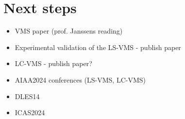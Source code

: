 \documentclass{beamer}
\begin{document}
\section{Next steps}
\begin{frame}
\begin{itemize}
	\item VMS paper (prof. Janssens reading)
	\item Experimental validation of the LS-VMS - publish paper
	\item LC-VMS - publish paper?
\end{itemize}

\begin{itemize}
	\item AIAA2024 conferences (LS-VMS, LC-VMS)
	\item DLES14 
	\item ICAS2024
\end{itemize}

\end{frame}
\end{document}
